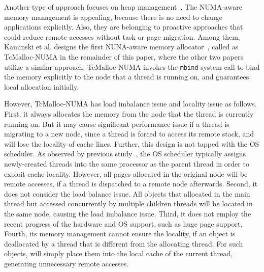 Another type of approach focuses on heap management~\cite{tcmallocnew, kim2013node, yang2019jarena}. The NUMA-aware memory management is appealing, because there is no need to change applications explicitly. Also, they are belonging to proactive approaches that could reduce remote accesses without task or page migration. Among them, Kaminski et al. designs the first NUNA-aware memory allocator~\cite{tcmallocnew}, called as TcMalloc-NUMA in the remainder of this paper, where the other two papers utilize a similar approach. TcMalloc-NUMA invokes the \texttt{mbind} system call to bind the memory explicitly to the node that a thread is running on, and guarantees local allocation initially.  

However, TcMalloc-NUMA has load imbalance issue and locality issue as follows. First, it always allocates the memory from the node that the thread is currently running on. But it may cause significant performance issue if a thread is migrating to a new node, since a thread is forced to access its remote stack, and will lose the locality of cache lines. Further, this design is not tapped with the OS scheduler. As observed by previous study~\cite{Grace}, the OS scheduler typically assigns newly-created threads into the same processor as the parent thread in order to exploit cache locality. However, all pages allocated in the original node will be remote accesses, if a thread is dispatched to a remote node afterwards.  Second, it does not consider the load balance issue.  All objects that allocated in the main thread but accessed concurrently by multiple children threads will be located in the same node, causing the load imbalance issue. Third, it does not employ the recent progress of the hardware and OS support, such as huge page support. Fourth, its memory management cannot ensure the locality, if an object is deallocated by a thread that is different from the allocating thread. For such objects, \TN{} will simply place them into the local cache of the current thread, generating unnecessary remote accesses.  


\begin{comment}

It first assumes that a memory block is belong to the same node for its allocating thread. However, this assumption is invalid, and is also contradict with the first-touch policy of the OS. 

If there is no such assumption, we will expect that the OS will provide an efficient API to query the locality of a page. However, no such APIs exist in both Linux and Windows. 

It checks the physical memory usage to determine the future allocations of the same node or the re-use of a remote node. But that is very slow by checking meminfo. 

In the end, it utilizes the mbind to bind the memory to a node specifically. 
	
\end{comment}
	 

